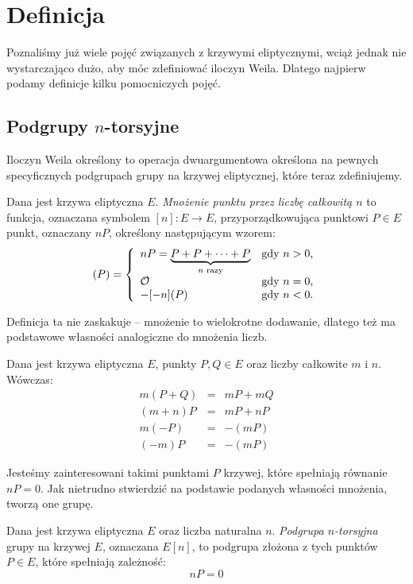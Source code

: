 \section{Definicja}

Poznaliśmy już wiele pojęć związanych z krzywymi eliptycznymi,
wciąż jednak nie wystarczająco dużo,
aby móc zdefiniować iloczyn Weila.
Dlatego najpierw podamy definicje kilku pomocniczych pojęć.

\subsection*{Podgrupy $n$-torsyjne}

Iloczyn Weila określony to operacja dwuargumentowa
określona na pewnych specyficznych podgrupach
grupy na krzywej eliptycznej,
które teraz zdefiniujemy.

\begin{definition}
Dana jest krzywa eliptyczna $E$.
\emph{Mnożenie punktu przez liczbę całkowitą $n$}
to funkcja,
oznaczana symbolem $[n] \colon E \to E$,
przyporządkowująca punktowi $P \in E$ punkt, oznaczany $nP$,
określony następującym wzorem:
\begin{equation}
[n](P) =
\fundefthree
{nP = \underbrace{P + P + \cdots + P}_{n\textrm{ razy}}}{n > 0}
{\ecident}{n = 0}
{-[-n](P)}{n < 0}
\end{equation}
\end{definition}

Definicja ta nie zaskakuje -- mnożenie to wielokrotne dodawanie,
dlatego też ma podstawowe własności analogiczne do mnożenia liczb.

\begin{fact}
Dana jest krzywa eliptyczna $E$, punkty $P, Q \in E$
oraz liczby całkowite $m$ i $n$.
Wówczas:
\begin{eqnarray*}
m(P + Q) & = & mP + mQ \\
(m + n)P & = & mP + nP \\
m(-P) & = & -(mP) \\
(-m)P & = & -(mP)
\end{eqnarray*}
\end{fact}

Jesteśmy zainteresowani takimi punktami $P$ krzywej,
które spełniają równanie $nP = 0$.
Jak nietrudno stwierdzić na podstawie podanych własności mnożenia,
tworzą one grupę.

\begin{definition}
Dana jest krzywa eliptyczna $E$
oraz liczba naturalna $n$.
\emph{Podgrupa $n$-torsyjna} grupy na krzywej $E$,
oznaczana $E[n]$,
to podgrupa złożona z tych punktów $P \in E$,
które spełniają zależność:
\begin{equation}
nP = 0
\end{equation}
\end{definition}

